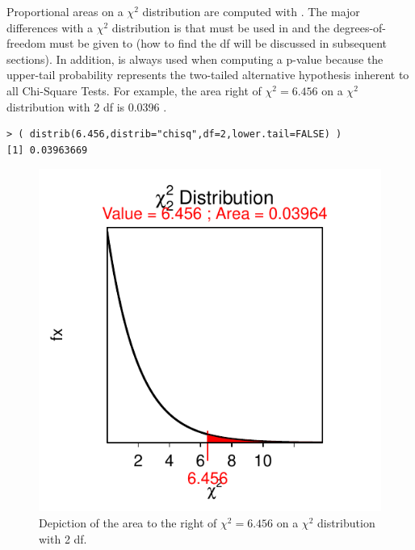 \documentclass[10pt,openany]{book}\usepackage[]{graphicx}\usepackage[]{color}
\makeatletter
\newenvironment{kframe}{%
 \def\at@end@of@kframe{}%
 \ifinner\ifhmode%
  \def\at@end@of@kframe{\end{minipage}}%
  \begin{minipage}{\columnwidth}%
 \fi\fi%
 \def\FrameCommand##1{\hskip\@totalleftmargin \hskip-\fboxsep
 \colorbox{shadecolor}{##1}\hskip-\fboxsep
     \hskip-\linewidth \hskip-\@totalleftmargin \hskip\columnwidth}%
 \MakeFramed {\advance\hsize-\width
   \@totalleftmargin\z@ \linewidth\hsize
   \@setminipage}}%
 {\par\unskip\endMakeFramed%
 \at@end@of@kframe}
\newenvironment{knitrout}{}{} %
\makeatother
\begin{document}
Proportional areas on a $\chi^2$ distribution are computed with . The major differences with a $\chi^2$ distribution is that  must be used in  and the degrees-of-freedom must be given to  (how to find the df will be discussed in subsequent sections). In addition,  is always used when computing a p-value because the upper-tail probability represents the two-tailed alternative hypothesis inherent to all Chi-Square Tests. For example, the area right of $\chi^2=6.456$ on a $\chi^2$ distribution with 2 df is 0.0396 .
\vspace{-3pt}
\begin{knitrout}
\color{fgcolor}\begin{kframe}
\begin{verbatim}
> ( distrib(6.456,distrib="chisq",df=2,lower.tail=FALSE) )
[1] 0.03963669
\end{verbatim}
\end{kframe}\begin{figure}[hbtp]

{\centering \includegraphics[width=.4\linewidth]{Figs/chiarea1-1} 

}

\caption[Depiction of the area to the right of $\chi^2=6.456$ on a $\chi^2$ distribution with 2 df]{Depiction of the area to the right of $\chi^2=6.456$ on a $\chi^2$ distribution with 2 df.}\label{fig:chiarea1}
\end{figure}


\end{knitrout}
\end{document}
